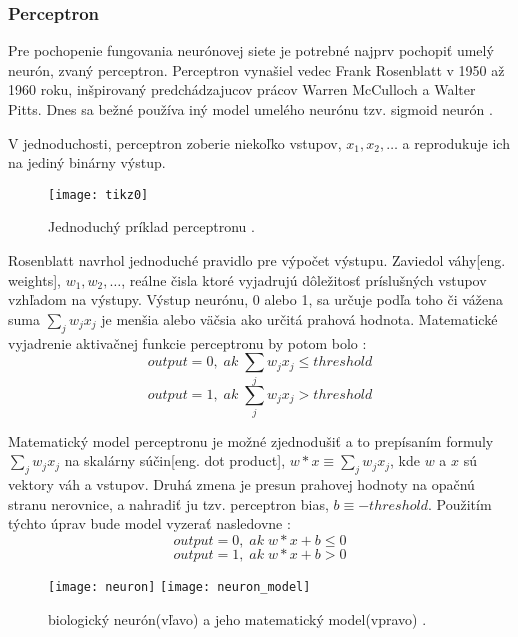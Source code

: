 \subsubsection{Perceptron}
Pre pochopenie fungovania neurónovej siete je potrebné najprv pochopiť umelý neurón, zvaný perceptron.
Perceptron vynašiel vedec Frank Rosenblatt v 1950 až 1960 roku, inšpirovaný predchádzajucov prácov Warren McCulloch a Walter Pitts.
Dnes sa bežné používa iný model umelého neurónu tzv. sigmoid neurón \cite{odkaz:HandwrittenDigitRecognision}.

V jednoduchosti, perceptron zoberie niekoľko vstupov, $x_1, x_2, \dots$ a reprodukuje ich na jediný binárny výstup.
\begin{figure}[H]
	\centering
	\texttt{[image: tikz0]}
	\caption{Jednoduchý príklad perceptronu \cite{odkaz:HandwrittenDigitRecognision}.}
	\label{pic:Perceptron}
\end{figure}
Rosenblatt navrhol jednoduché pravidlo pre výpočet výstupu.
Zaviedol váhy[eng. weights], $w_1, w_2, \dots$,
    reálne čisla ktoré vyjadrujú dôležitosť príslušných vstupov vzhľadom na výstupy.
Výstup neurónu, 0 alebo 1, sa určuje podľa toho či vážena suma $\sum_j w_j x_j$ je menšia alebo väčsia ako určitá prahová hodnota.
Matematické vyjadrenie aktivačnej funkcie perceptronu by potom bolo \cite{odkaz:HandwrittenDigitRecognision}:
\begin{equation}
    output = 0, \; ak \; \sum_j w_j x_j \leq threshold
\end{equation}
\begin{equation}
    output = 1, \; ak \; \sum_j w_j x_j > threshold
\end{equation}

Matematický model perceptronu je možné zjednodušiť a to prepísaním formuly $\sum_j w_j x_j$ na skalárny súčin[eng. dot product],
    $w*x \equiv \sum_j w_j x_j$, kde $w$ a $x$ sú vektory váh a vstupov.
Druhá zmena je presun prahovej hodnoty na opačnú stranu nerovnice, a nahradiť ju tzv. perceptron bias, $b \equiv -threshold$.
Použitím týchto úprav bude model vyzerať nasledovne \cite{odkaz:HandwrittenDigitRecognision}:
\begin{equation}
    output = 0, \; ak \; w*x + b \leq 0
\end{equation}
\begin{equation}
    output = 1, \; ak \; w*x + b > 0
\end{equation}

\begin{figure}[H]
    \centering
    \texttt{[image: neuron]}
    \qquad
    \texttt{[image: neuron\_model]}
    \caption{biologický neurón(vľavo) a jeho matematický model(vpravo) \cite{odkaz:ConvolutionalNeuralNetworkCS231n}.}
    \label{pic:Neuron}
\end{figure}

